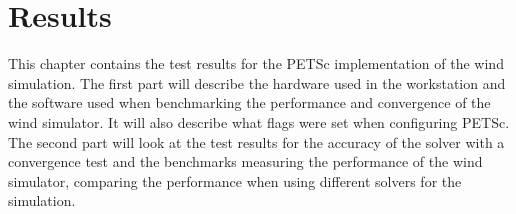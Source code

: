 \chapter{Results}

This chapter contains the test results for the PETSc implementation of the wind
simulation. The first part will describe the hardware used in the workstation
and the software used when benchmarking the performance and convergence of the
wind simulator. It will also describe what flags were set when configuring PETSc.
The second part will look at the test results for the accuracy of the solver
with a convergence test and the benchmarks measuring the performance of the
wind simulator, comparing the performance when using different solvers for the
simulation.




